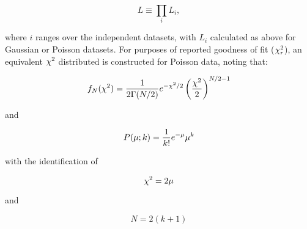 \begin{equation}
L \equiv \prod_i{L_i},
\end{equation}

where $i$ ranges over the independent datasets, with $L_i$ calculated
as above for Gaussian or Poisson datasets.  For purposes of reported
goodness of fit ($\chi^2_r$), an equivalent $\chi^2$ distributed is
constructed for Poisson data, noting that:

\begin{equation}
f_N(\chi^2) = {1\over{2\Gamma(N/2)}}e^{-\chi^2/2}\left({\chi^2\over{2}}\right)^{N/2-1}
\end{equation}

and

\begin{equation}
P(\mu;k) = {1\over{k!}}e^{-\mu} \mu^{k}
\end{equation}

with the identification of

\begin{equation}
\chi^2 = 2\mu
\end{equation}

and 

\begin{equation}
N = 2(k + 1)
\end{equation}

